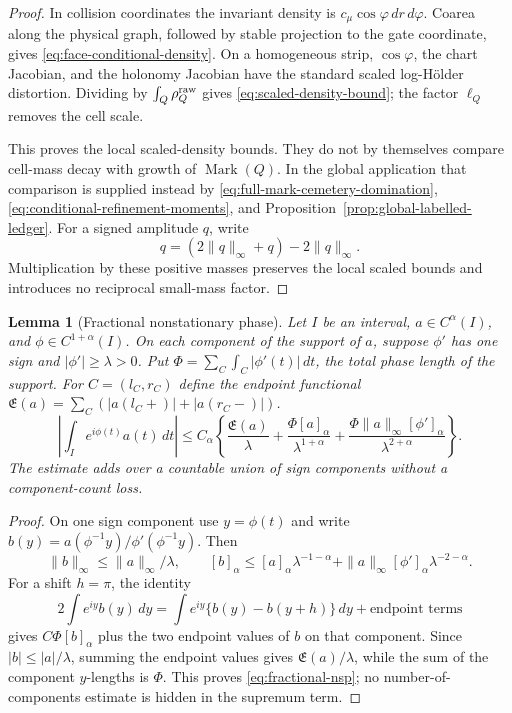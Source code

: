\documentclass[11pt]{article}
\newtheorem{lemma}[theorem]{Lemma}
\begin{document}
\begin{proof}
In collision coordinates the invariant density is
\(c_\mu\cos\varphi\,dr\,d\varphi\).  Coarea along the physical graph, followed
by stable projection to the gate coordinate, gives
\eqref{eq:face-conditional-density}.  On a homogeneous strip,
\(\cos\varphi\), the chart Jacobian, and the holonomy Jacobian have the
standard scaled log-Hölder distortion.  Dividing by
\(\int_Q\rho_Q^{\rm raw}\) gives \eqref{eq:scaled-density-bound}; the factor
\(\ell_Q\) removes the cell scale.

This proves the local scaled-density bounds.  They do not by themselves
compare cell-mass decay with growth of $\operatorname{Mark}(Q)$.  In the
global application that comparison is supplied instead by
\eqref{eq:full-mark-cemetery-domination},
\eqref{eq:conditional-refinement-moments}, and
Proposition~\ref{prop:global-labelled-ledger}.  For a signed amplitude $q$,
write
\[
 q=(2\|q\|_\infty+q)-2\|q\|_\infty.
\]
Multiplication by these positive masses preserves the local scaled bounds and
introduces no reciprocal small-mass factor.
\end{proof}

\begin{lemma}[Fractional nonstationary phase]
\label{lem:fractional-nonstationary-phase}
Let \(I\) be an interval, \(a\in C^\alpha(I)\), and
\(\phi\in C^{1+\alpha}(I)\).  On each component of the support of \(a\),
suppose \(\phi'\) has one sign and \(|\phi'|\ge\lambda>0\).  Put
\(\Phi=\sum_C\int_C|\phi'(t)|\,dt\), the total phase length of the support.
For $C=(l_C,r_C)$ define the endpoint functional
$\mathfrak E(a)=\sum_C(|a(l_C+)|+|a(r_C-)|)$.
\begin{equation}
\label{eq:fractional-nsp}
 \left|\int_Ie^{i\phi(t)}a(t)\,dt\right|
 \le C_\alpha\left\{
 \frac{\mathfrak E(a)}{\lambda}
 +\frac{\Phi[a]_\alpha}{\lambda^{1+\alpha}}
 +\frac{\Phi\|a\|_\infty[\phi']_\alpha}
             {\lambda^{2+\alpha}}\right\}.
\end{equation}
The estimate adds over a countable union of sign components without a
component-count loss.
\end{lemma}

\begin{proof}
On one sign component use \(y=\phi(t)\) and write
\(b(y)=a(\phi^{-1}y)/\phi'(\phi^{-1}y)\).  Then
\[
 \|b\|_\infty\le\|a\|_\infty/\lambda,\qquad
 [b]_\alpha\le
 [a]_\alpha\lambda^{-1-\alpha}
 +\|a\|_\infty[\phi']_\alpha\lambda^{-2-\alpha}.
\]
For a shift \(h=\pi\), the identity
\[
 2\int e^{iy}b(y)\,dy
 =\int e^{iy}\{b(y)-b(y+h)\}\,dy+\text{endpoint terms}
\]
gives $C\Phi[b]_\alpha$ plus the two endpoint values of $b$ on that
component.  Since $|b|\le |a|/\lambda$, summing the endpoint values gives
$\mathfrak E(a)/\lambda$, while the sum of the component $y$-lengths is
$\Phi$.  This proves \eqref{eq:fractional-nsp}; no number-of-components
estimate is hidden in the supremum term.
\end{proof}
\end{document}
